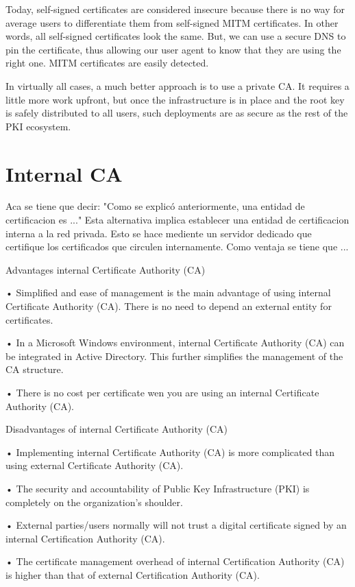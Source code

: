 Today, self-signed certificates are considered insecure because there is no way for average users to
differentiate them from self-signed MITM certificates. In other words, all self-signed certificates
look the same. But, we can use a secure DNS to pin the certificate, thus allowing our user agent to
know that they are using the right one. MITM certificates are easily detected.

In virtually all cases, a much better approach is to use a private
CA. It requires a little more work upfront, but once the
infrastructure is in place and the root key is safely distributed to
all users, such deployments are as secure as the rest of the PKI
ecosystem.
\section{Internal CA}

Aca se tiene que decir: "Como se explicó anteriormente, una entidad de certificacion es ..."
Esta alternativa implica establecer una entidad de certificacion interna a la red privada. Esto se hace 
mediente un servidor dedicado que certifique los certificados que circulen internamente.
Como ventaja se tiene que ... 

Advantages internal Certificate Authority (CA)

• Simplified and ease of management is the main advantage of using internal Certificate 
Authority (CA). There is no need to depend an external entity for certificates.

• In a Microsoft Windows environment, internal Certificate Authority (CA) can be integrated in Active
 Directory. This further simplifies the management of the CA structure.

• There is no cost per certificate wen you are using an internal Certificate Authority (CA).

Disadvantages of internal Certificate Authority (CA)

• Implementing internal Certificate Authority (CA) is more complicated than using external 
Certificate Authority (CA).

• The security and accountability of Public Key Infrastructure (PKI) is completely on the 
organization's shoulder.

• External parties/users normally will not trust a digital certificate signed by an internal Certification 
Authority (CA).

• The certificate management overhead of internal Certification Authority (CA) is higher than that 
of external Certification Authority (CA).

